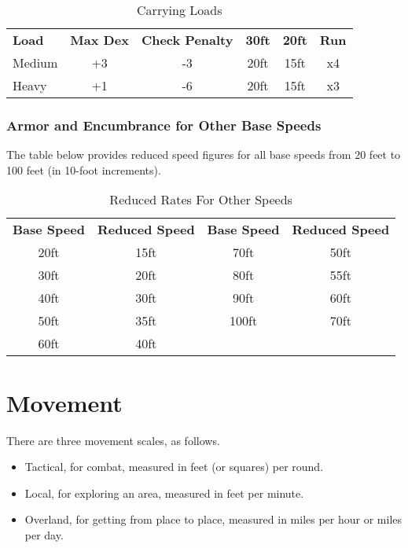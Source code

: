 \begin{table}[htb]
\caption{Carrying Loads}
\centering
\begin{tabular}{l c c c c c}
\textbf{Load} & \textbf{Max Dex} & \textbf{Check Penalty} & \textbf{30ft} & \textbf{20ft} & \textbf{Run}\\
Medium & +3 & -3 & 20ft & 15ft & x4\\
Heavy & +1 & -6 & 20ft & 15ft & x3\\
\end{tabular}
\end{table}

\subsubsection{Armor and Encumbrance for Other Base Speeds}

The table below provides reduced speed figures for all base speeds from 20 feet 
to 100 feet (in 10-foot increments).

\begin{table}[htb]
\caption{Reduced Rates For Other Speeds}
\centering
\begin{tabular}{c c c c}
\textbf{Base Speed} & \textbf{Reduced Speed} & \textbf{Base Speed} & \textbf{Reduced Speed}\\
20ft & 15ft & 70ft & 50ft\\
30ft & 20ft & 80ft & 55ft\\
40ft & 30ft & 90ft & 60ft\\
50ft & 35ft & 100ft & 70ft\\
60ft & 40ft & & \\
\end{tabular}
\end{table}

\section{Movement}

There are three movement scales, as follows.

\begin{itemize}
\item Tactical, for combat, measured in feet (or squares) per round.
\item Local, for exploring an area, measured in feet per minute.
\item Overland, for getting from place to place, measured in miles per hour or miles per day.
\end{itemize}

